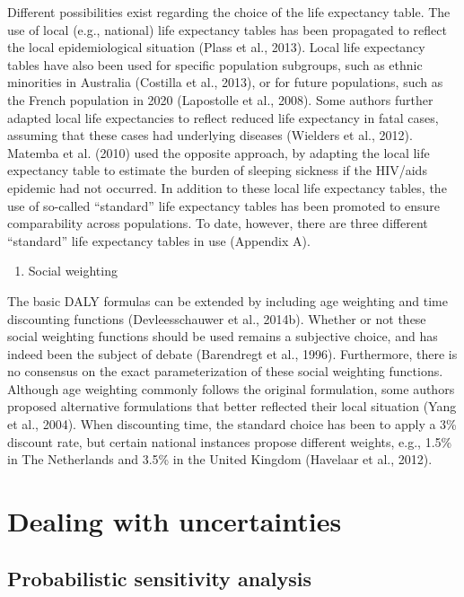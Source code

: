 \documentclass[]{book}
\providecommand{\tightlist}{%
  \setlength{\itemsep}{0pt}\setlength{\parskip}{0pt}}
\begin{document}
Different possibilities exist regarding the choice of the life
expectancy table. The use of local (e.g., national) life expectancy
tables has been propagated to reflect the local epidemiological
situation (Plass et al., 2013). Local life expectancy tables have also
been used for specific population subgroups, such as ethnic minorities
in Australia (Costilla et al., 2013), or for future populations, such as
the French population in 2020 (Lapostolle et al., 2008). Some authors
further adapted local life expectancies to reflect reduced life
expectancy in fatal cases, assuming that these cases had underlying
diseases (Wielders et al., 2012). Matemba et al. (2010) used the
opposite approach, by adapting the local life expectancy table to
estimate the burden of sleeping sickness if the HIV/aids epidemic had
not occurred. In addition to these local life expectancy tables, the use
of so-called ``standard'' life expectancy tables has been promoted to
ensure comparability across populations. To date, however, there are
three different ``standard'' life expectancy tables in use (Appendix A).

\begin{enumerate}
\def\labelenumi{(\arabic{enumi})}
\setcounter{enumi}{3}
\tightlist
\item
  Social weighting
\end{enumerate}

The basic DALY formulas can be extended by including age weighting and
time discounting functions (Devleesschauwer et al., 2014b). Whether or
not these social weighting functions should be used remains a subjective
choice, and has indeed been the subject of debate (Barendregt et al.,
1996). Furthermore, there is no consensus on the exact parameterization
of these social weighting functions. Although age weighting commonly
follows the original formulation, some authors proposed alternative
formulations that better reflected their local situation (Yang et al.,
2004). When discounting time, the standard choice has been to apply a
3\% discount rate, but certain national instances propose different
weights, e.g., 1.5\% in The Netherlands and 3.5\% in the United Kingdom
(Havelaar et al., 2012).

\section{Dealing with uncertainties}\label{dealing-with-uncertainties}

\subsection{Probabilistic sensitivity
analysis}\label{probabilistic-sensitivity-analysis}
\end{document}
